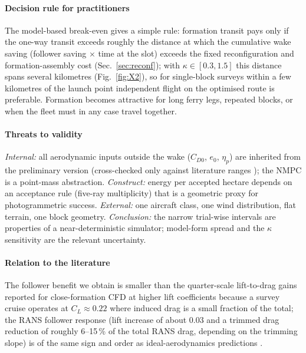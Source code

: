 \documentclass[preprint,12pt]{elsarticle}
\begin{document}
\paragraph{Decision rule for practitioners} The model-based break-even gives a simple rule: formation transit pays only if the one-way transit exceeds roughly the distance at which the cumulative wake saving (follower saving $\times$ time at the slot) exceeds the fixed reconfiguration and formation-assembly cost (Sec.~\ref{sec:reconf}); with $\kappa\in[0.3,1.5]$ this distance spans several kilometres (Fig.~\ref{fig:X2}), so for single-block surveys within a few kilometres of the launch point independent flight on the optimised route is preferable. Formation becomes attractive for long ferry legs, repeated blocks, or when the fleet must in any case travel together.

\paragraph{Threats to validity} \emph{Internal:} all aerodynamic inputs outside the wake ($C_{D0}$, $e_0$, $\eta_p$) are inherited from the preliminary version (cross-checked only against literature ranges \cite{gryte2018,reinhardt2022}); the NMPC is a point-mass abstraction. \emph{Construct:} energy per accepted hectare depends on an acceptance rule (five-ray multiplicity) that is a geometric proxy for photogrammetric success. \emph{External:} one aircraft class, one wind distribution, flat terrain, one block geometry. \emph{Conclusion:} the narrow trial-wise intervals are properties of a near-deterministic simulator; model-form spread and the $\kappa$ sensitivity are the relevant uncertainty.

\paragraph{Relation to the literature} The follower benefit we obtain is smaller than the quarter-scale lift-to-drag gains reported for close-formation CFD at higher lift coefficients \cite{oendo2025} because a survey cruise operates at $C_L\approx0.22$ where induced drag is a small fraction of the total; the RANS follower response (lift increase of about 0.03 and a trimmed drag reduction of roughly 6--15\,\% of the total RANS drag, depending on the trimming slope) is of the same sign and order as ideal-aerodynamics predictions \cite{king2005,katz2001}.
\end{document}
